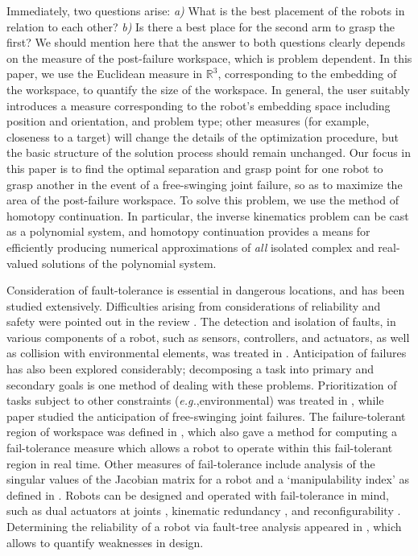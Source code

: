 \documentclass[12pt]{report}
\begin{document}
Immediately, two questions arise: \emph{a)} What is the best placement of the robots in relation to each other?   \emph{b)}  Is there a best place for the second arm to grasp the first? 
We should mention here that the answer to both questions clearly depends on the measure of the post-failure workspace, which is problem dependent. In this paper, we use the Euclidean measure in $\mathbb{R}^3$, corresponding to the embedding of the workspace, to quantify the size of the workspace.  In general, the user suitably introduces a measure corresponding to the robot's embedding space including position and orientation, and problem type; other measures (for example, closeness to a target) will change the details of the optimization procedure, but the basic structure of the solution process should remain unchanged.  Our focus in this paper is 
to find the optimal separation and grasp point for one robot to grasp another in the event of a free-swinging joint failure, so as to maximize the area of the post-failure workspace. To solve this problem, we use the method of homotopy continuation.  In particular, the inverse kinematics problem can be cast as a polynomial system, and homotopy continuation provides a means for efficiently producing numerical approximations of \emph{all} isolated complex and real-valued solutions of the polynomial system.  



Consideration of fault-tolerance is essential in dangerous locations, and has been studied extensively.  Difficulties arising from considerations of reliability and safety were pointed out in the review  \cite{DFL02}.  The detection and isolation of faults, in various components of a robot, such as sensors, controllers, and actuators, as well as collision with environmental elements, was treated in \cite{ASKJ07,JS07,DF09,BCFP08}.  Anticipation of failures has also been explored considerably;  decomposing a task into primary and secondary goals is one method of dealing with these problems.  Prioritization of tasks subject to other constraints (\emph{e.g.},environmental) was treated in \cite{CMY03,LM97}, while paper \cite{EM98} studied the anticipation of free-swinging joint failures.   The failure-tolerant region of workspace was defined in \cite{GMB99}, which also gave a method for computing a fail-tolerance measure which allows a robot to operate within this fail-tolerant region  in real time.  Other measures of fail-tolerance include analysis of the singular values of the Jacobian matrix for a robot \cite{Mac90} and a `manipulability index' as defined in \cite{RM96}.
Robots can be designed and operated with fail-tolerance in mind, such as dual actuators at joints \cite{HN07}, kinematic redundancy \cite{MON99,HN07,WHC93,YMC06,PK96}, and reconfigurability \cite{AgPa2009}.  Determining the reliability of a robot via fault-tree analysis appeared in \cite{CW01}, which allows to quantify weaknesses in design.  
\end{document}
